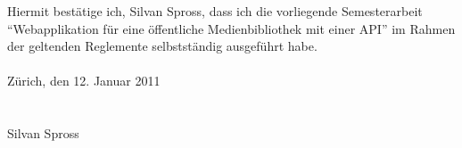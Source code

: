 Hiermit bestätige ich, Silvan Spross, dass ich die vorliegende Semesterarbeit
``Webapplikation für eine öffentliche Medienbibliothek mit einer API'' im
Rahmen der geltenden Reglemente selbstständig ausgeführt habe.\\
\\
Zürich, den 12. Januar 2011\\
\\\\
Silvan Spross